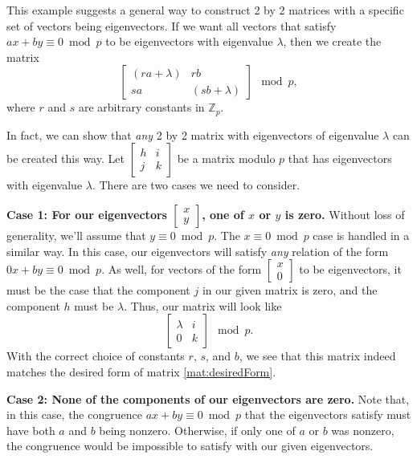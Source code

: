 \documentclass[a4paper, 12pt, reqno]{amsart}
\newcommand{\Z}{\mathbb{Z}}
\newcommand\smallmat[1]{\left[\begin{smallmatrix}#1\end{smallmatrix}\right]}
\begin{document}
	This example suggests a general way to construct 2 by 2 matrices with a specific set of vectors being eigenvectors. If we want all vectors that satisfy 
	$ax + by \equiv 0 \bmod{p}$ to be eigenvectors with eigenvalue $\lambda$, then we create the matrix
	\begin{equation}
		\label{mat:desiredForm}
		\begin{bmatrix}
			(ra + \lambda) & rb \\
			sa & (sb + \lambda)
		\end{bmatrix} \mod{p},
	\end{equation}
	where $r$ and $s$ are arbitrary constants in $\Z_p$.
	
	In fact, we can show that \emph{any} 2 by 2 matrix with eigenvectors of eigenvalue $\lambda$ can be created this way. Let $\smallmat{h&i\\j&k}$ be a matrix modulo $p$ that
	has eigenvectors with eigenvalue $\lambda$. There are two cases we need to consider.
	
	\textbf{Case 1: For our eigenvectors $\smallmat{x\\y}$, one of $x$ or $y$ is zero.} Without loss of generality, we'll assume that $y \equiv 0 \bmod{p}$. The 
	$x \equiv 0 \bmod{p}$ case is handled in a similar way. In this case, our eigenvectors will satisfy \emph{any} relation of the form $0x + by \equiv 0 \bmod{p}$. As well, 
	for vectors of the form $\smallmat{x\\0}$ to be eigenvectors, it must be the case that the component $j$ in our given matrix is zero, and the component $h$ must be 
	$\lambda$. Thus, our matrix will look like
	\[
		\begin{bmatrix}
			\lambda & i \\
			0       & k
		\end{bmatrix} \mod{p}.
	\]
	With the correct choice of constants $r$, $s$, and $b$, we see that this matrix indeed matches the desired form of matrix \ref{mat:desiredForm}.
	
	\textbf{Case 2: None of the components of our eigenvectors are zero.} Note that, in this case, the congruence $ax + by \equiv 0 \bmod{p}$ that the eigenvectors satisfy 
	must have both $a$ and $b$ being nonzero. Otherwise, if only one of $a$ or $b$ was nonzero, the congruence would be impossible to satisfy with our given eigenvectors.
\end{document}
